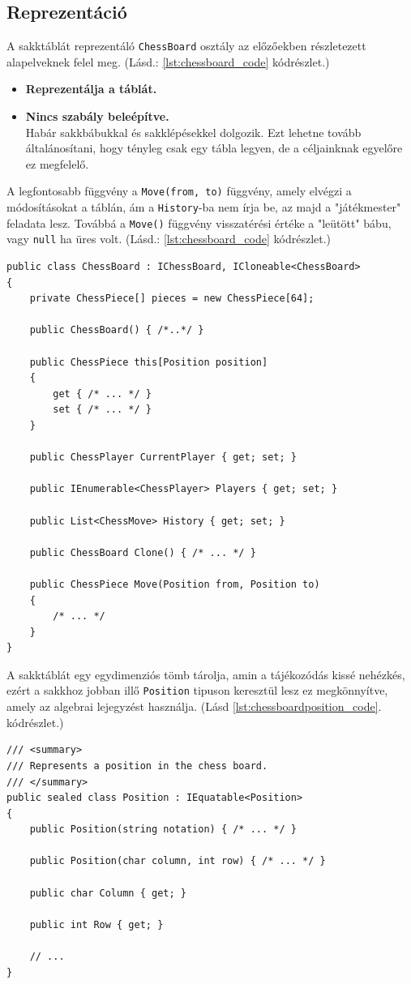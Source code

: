 \documentclass[twoside, a4paper, 12pt]{article}
\begin{document}
\subsection{Reprezentáció}
A sakktáblát reprezentáló \texttt{ChessBoard} osztály az előzőekben részletezett alapelveknek felel meg. (Lásd.: \ref{lst:chessboard_code} kódrészlet.)
\begin{itemize}
	\item \textbf{Reprezentálja a táblát.}
	\item \textbf{Nincs szabály beleépítve.} \\ 
	Habár sakkbábukkal és sakklépésekkel dolgozik. Ezt lehetne tovább általánosítani, hogy tényleg csak egy tábla legyen, de a céljainknak egyelőre ez megfelelő.
\end{itemize}

A legfontosabb függvény a \texttt{Move(from, to)} függvény, amely elvégzi a módosításokat a táblán, ám a \texttt{History}-ba nem írja be, az majd a "játékmester" feladata lesz. Továbbá a \texttt{Move()} függvény visszatérési értéke a "leütött" bábu, vagy \texttt{null} ha üres volt. (Lásd.: \ref{lst:chessboard_code} kódrészlet.)

\begin{lstlisting}[caption=Sakktábla implementáció vázlat, label=lst:chessboard_code]
public class ChessBoard : IChessBoard, ICloneable<ChessBoard>
{
	private ChessPiece[] pieces = new ChessPiece[64];

	public ChessBoard()	{ /*..*/ }

	public ChessPiece this[Position position]
	{
		get { /* ... */ }
		set { /* ... */ }
	}

	public ChessPlayer CurrentPlayer { get; set; }

	public IEnumerable<ChessPlayer> Players { get; set; }

	public List<ChessMove> History { get; set; }

	public ChessBoard Clone() { /* ... */ }

	public ChessPiece Move(Position from, Position to)
	{
		/* ... */
	}
}
\end{lstlisting}

A sakktáblát egy egydimenziós tömb tárolja, amin a tájékozódás kissé nehézkés, ezért a sakkhoz jobban illő \texttt{Position} tipuson keresztül lesz ez megkönnyítve, amely az algebrai lejegyzést használja. (Lásd \ref{lst:chessboardposition_code}. kódrészlet.)

\begin{lstlisting}[caption=Pozíciók a sakktáblán - Position osztály, label=lst:chessboardposition_code]
/// <summary>
/// Represents a position in the chess board.
/// </summary>
public sealed class Position : IEquatable<Position>
{
	public Position(string notation) { /* ... */ }
	
	public Position(char column, int row) { /* ... */ }
	
	public char Column { get; }
	
	public int Row { get; }
	
	// ...
}
\end{lstlisting}
\end{document}
